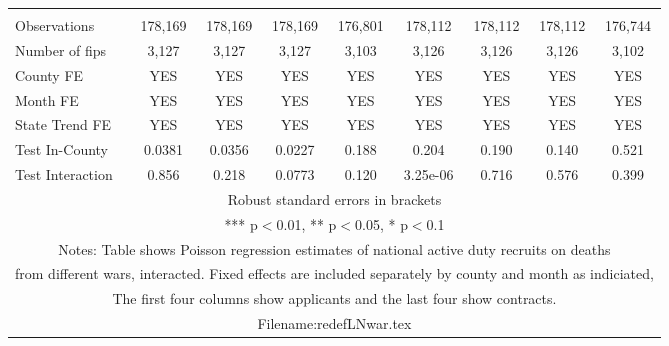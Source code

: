 \documentclass[]{article}
\begin{document}
\begin{tabular}{lcccccccc}
 &  &  &  &  &  &  &  &  \\
Observations & 178,169 & 178,169 & 178,169 & 176,801 & 178,112 & 178,112 & 178,112 & 176,744 \\
Number of fips & 3,127 & 3,127 & 3,127 & 3,103 & 3,126 & 3,126 & 3,126 & 3,102 \\
County FE & YES & YES & YES & YES & YES & YES & YES & YES \\
Month FE & YES & YES & YES & YES & YES & YES & YES & YES \\
State Trend FE & YES & YES & YES & YES & YES & YES & YES & YES \\
Test In-County & 0.0381 & 0.0356 & 0.0227 & 0.188 & 0.204 & 0.190 & 0.140 & 0.521 \\
 Test Interaction & 0.856 & 0.218 & 0.0773 & 0.120 & 3.25e-06 & 0.716 & 0.576 & 0.399 \\ \hline
\multicolumn{9}{c}{ Robust standard errors in brackets} \\
\multicolumn{9}{c}{ *** p$<$0.01, ** p$<$0.05, * p$<$0.1} \\
\multicolumn{9}{c}{ Notes: Table shows Poisson regression estimates of national active duty recruits on deaths} \\
\multicolumn{9}{c}{ from different wars, interacted. Fixed effects are included separately by county and month as indiciated,} \\
\multicolumn{9}{c}{ The first four columns show applicants and the last four show contracts.} \\
\multicolumn{9}{c}{ Filename:redefLNwar.tex} \\
\end{tabular}
\end{document}
